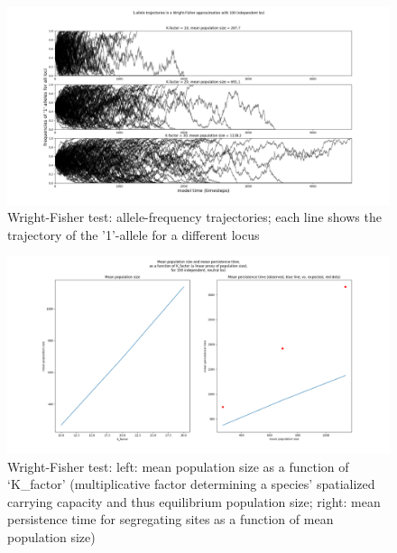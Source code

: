 ﻿\documentclass{article}
\begin{document}
\begin{figure}[h!]
\includegraphics[width=175mm]{./img/validation/wf/allele_trajectories.png}
        \caption{Wright-Fisher test: allele-frequency trajectories; each line shows the trajectory of the '1'-allele for a different locus}
        \label{fig:wf_trajs}
\end{figure}


\begin{figure}[h!]
\includegraphics[width=175mm]{./img/validation/wf/pop_size_vs_K_factor_and_mean_persist_t_vs_pop_size.png}
        \caption{Wright-Fisher test: left: mean population size as a function of `K\_factor' (multiplicative factor determining a species' spatialized carrying capacity and thus equilibrium population size; right: mean persistence time for segregating sites as a function of mean population size)}
        \label{fig:wf_persist_vs_popsize}
\end{figure}
\end{document}
